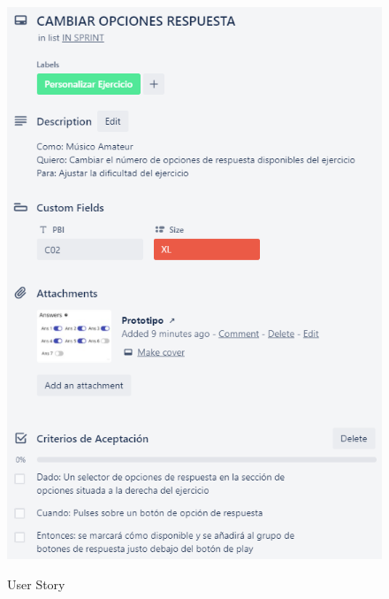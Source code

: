 \documentclass[12pt,twoside,titlepage]{report}
\begin{document}
{\begin{figure}[H]
    \centering
    \includegraphics[scale=1.3]{Scrum/User Stories/CambiarRespuestas}
    \label{fig:CambiarRespuestas}
    \caption{User Story}
\end{figure}

}
\end{document}
